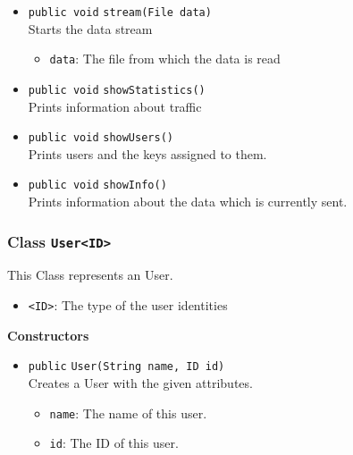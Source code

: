 \begin{itemize}
\item \lstinline|public void| \lstinline|stream|\lstinline|(File data)|\\
Starts the data stream
\begin{itemize}
\item \lstinline|data|: The file from which the data is read
\end{itemize}



\item \lstinline|public void| \lstinline|showStatistics|\lstinline|()|\\
Prints information about traffic



\item \lstinline|public void| \lstinline|showUsers|\lstinline|()|\\
Prints users and the keys assigned to them.



\item \lstinline|public void| \lstinline|showInfo|\lstinline|()|\\
Prints information about the data which is currently sent.



\end{itemize}

\subsubsection{Class \lstinline|User<ID>|}
This Class represents an User. \\


\begin{itemize}
\item \lstinline|<ID>|: The type of the user identities
\end{itemize}


\textbf{Constructors}
\begin{itemize}
\item \lstinline|public| \lstinline|User|\lstinline|(String name, ID id)|\\
Creates a User with the given attributes.
\begin{itemize}
\item \lstinline|name|: The name of this user.
\item \lstinline|id|: The ID of this user.
\end{itemize}



\end{itemize}


